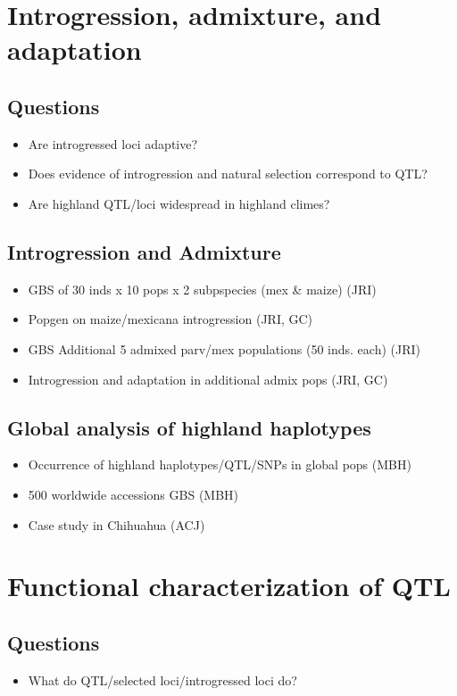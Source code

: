 \section{Introgression, admixture, and adaptation}
\subsection{Questions}
\begin{itemize}
\item Are introgressed loci adaptive?
\item Does evidence of introgression and natural selection correspond to QTL?
\item Are highland QTL/loci widespread in highland climes?
\end{itemize}

\subsection{Introgression and Admixture}
\begin{itemize}
\item GBS of 30 inds x 10 pops x 2 subpspecies (mex \& maize) (JRI)
\item Popgen on maize/mexicana introgression (JRI, GC)
\item GBS Additional 5 admixed parv/mex populations (50 inds. each) (JRI)
\item Introgression and adaptation in additional admix pops (JRI, GC)
\end{itemize}

\subsection{Global analysis of highland haplotypes}
\begin{itemize}
\item Occurrence of highland haplotypes/QTL/SNPs in global pops (MBH)
\item 500 worldwide accessions GBS (MBH)
\item Case study in Chihuahua (ACJ)
\end{itemize}




\section{Functional characterization of QTL}

\subsection{Questions}
\begin{itemize}
\item What do QTL/selected loci/introgressed loci do?
\end{itemize}

